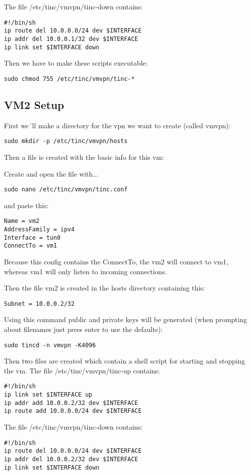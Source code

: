 \documentclass[10pt,a4paper]{article}
\begin{document}
The file /etc/tinc/vmvpn/tinc-down contains:
\begin{verbatim}
#!/bin/sh
ip route del 10.0.0.0/24 dev $INTERFACE
ip addr del 10.0.0.1/32 dev $INTERFACE
ip link set $INTERFACE down
\end{verbatim}

Then we have to make these scripts executable:
\begin{verbatim}
sudo chmod 755 /etc/tinc/vmvpn/tinc-*
\end{verbatim}

\subsection{VM2 Setup}
First we´ll make a directory for the vpn we want to create (called vmvpn):
\begin{verbatim}
sudo mkdir -p /etc/tinc/vmvpn/hosts
\end{verbatim}

Then a file is created with the basic info for this vm:

Create and open the file with...
\begin{verbatim}
sudo nano /etc/tinc/vmvpn/tinc.conf
\end{verbatim}
and paste this:
\begin{verbatim}
Name = vm2
AddressFamily = ipv4
Interface = tun0
ConnectTo = vm1
\end{verbatim}
Because this config contains the ConnectTo, the vm2 will connect to vm1, whereas vm1 will only listen to incoming connections.

Then the file vm2 is created in the hosts directory containing this:
\begin{verbatim}
Subnet = 10.0.0.2/32
\end{verbatim}

Using this command public and private keys will be generated (when prompting about filenames just press enter to use the defaults):
\begin{verbatim}
sudo tincd -n vmvpn -K4096
\end{verbatim}

Then two files are created which contain a shell script for starting and stopping the vm. The file /etc/tinc/vmvpn/tinc-up contains:
\begin{verbatim}
#!/bin/sh
ip link set $INTERFACE up
ip addr add 10.0.0.2/32 dev $INTERFACE
ip route add 10.0.0.0/24 dev $INTERFACE
\end{verbatim}

The file /etc/tinc/vmvpn/tinc-down contains:
\begin{verbatim}
#!/bin/sh
ip route del 10.0.0.0/24 dev $INTERFACE
ip addr del 10.0.0.2/32 dev $INTERFACE
ip link set $INTERFACE down
\end{verbatim}
\end{document}
